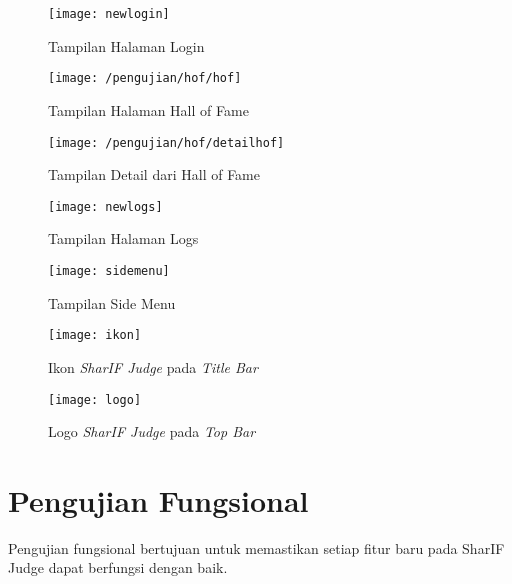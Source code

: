 \begin{enumerate}
	\begin{figure}[H]
		\centering  
		\texttt{[image: newlogin]}  
		\caption[Tampilan Halaman Login]{Tampilan Halaman Login} 
		\label{fig:newlogin} 
	\end{figure}
	
	\begin{figure}[H]
		\centering  
		\texttt{[image: /pengujian/hof/hof]}  
		\caption[Tampilan Halaman Hall of Fame]{Tampilan Halaman Hall of Fame} 
		\label{fig:newhof} 
	\end{figure}

	\begin{figure}[H]
		\centering  
		\texttt{[image: /pengujian/hof/detailhof]}  
		\caption[Tampilan Detail dari Hall of Fame]{Tampilan Detail dari Hall of Fame} 
		\label{fig:newhofdetail} 
	\end{figure}

	\begin{figure}[H]
		\centering  
		\texttt{[image: newlogs]}  
		\caption[Tampilan Halaman Logs]{Tampilan Halaman Logs} 
		\label{fig:newlogs} 
	\end{figure}

	\begin{figure}[H]
		\centering  
		\texttt{[image: sidemenu]}  
		\caption[Tampilan Side Menu]{Tampilan Side Menu} 
		\label{fig:sidemenu} 
	\end{figure}

	\begin{figure}[H]
		\centering  
		\texttt{[image: ikon]}  
		\caption[Ikon \textit{SharIF Judge} pada \textit{Title Bar}]{Ikon \textit{SharIF Judge} pada \textit{Title Bar}} 
		\label{fig:ikons} 
	\end{figure} 
	
	\begin{figure}[H]
		\centering  
		\texttt{[image: logo]}  
		\caption[Logo \textit{SharIF Judge} pada \textit{Top Bar}]{Logo \textit{SharIF Judge} pada \textit{Top Bar}} 
		\label{fig:logos} 
	\end{figure} 
\end{enumerate}

\section{Pengujian Fungsional}
Pengujian fungsional bertujuan untuk memastikan setiap fitur baru pada SharIF Judge dapat berfungsi dengan baik.
